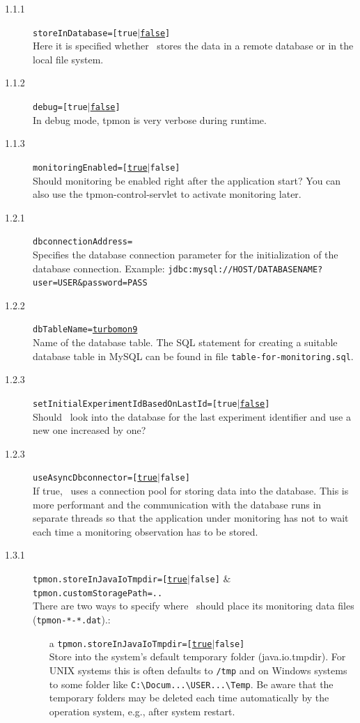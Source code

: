 \documentclass[a4paper,12pt]{scrartcl}
\begin{document}
\begin{description}
 \item [1.1.1] \texttt{storeInDatabase=[true$|$\underline{false}]} \\
Here it is specified whether \tpmon\ stores the data in a remote database or in the local file system.
\item [1.1.2] \texttt{debug=[true$|$\underline{false}]}  \\
In debug mode, tpmon is very verbose during runtime.
\item [1.1.3] \texttt{monitoringEnabled=[\underline{true}$|$false]} \\
Should monitoring be enabled right after the application start? You can also use the tpmon-control-servlet
to activate monitoring later.
\item [1.2.1] \texttt{dbconnectionAddress=} \\
Specifies the database connection parameter for the initialization of the database connection. Example:
\small
\texttt{jdbc:mysql://HOST/DATABASENAME?user=USER\&password=PASS}
\normalsize
\item [1.2.2] \texttt{dbTableName=\underline{turbomon9}} \\
Name of the database table. The SQL statement for creating a suitable database table
in MySQL can be found in file \small \texttt{table-for-monitoring.sql}\normalsize.
\item [1.2.3] \texttt{setInitialExperimentIdBasedOnLastId=[true$|$\underline{false}]} \\
Should \tpmon\ look into the database for the last experiment identifier and use a new one increased by one?
\item [1.2.3] \texttt{useAsyncDbconnector=[\underline{true}$|$false]} \\
If true, \tpmon\ uses a connection pool for storing data into the database. This is more performant and the communication
with the database runs in separate threads so that the application under monitoring has not to wait each time a monitoring
observation has to be stored.
\item [1.3.1] \footnotesize \texttt{tpmon.storeInJavaIoTmpdir=[\underline{true}$|$false]} $\&$ \texttt{tpmon.customStoragePath=..} \normalsize \\
There are two ways to specify where \tpmon\ should place its monitoring data files (\texttt{tpmon-*-*.dat}).:
\begin{enumerate}
\item [a] \texttt{tpmon.storeInJavaIoTmpdir=[\underline{true}$|$false]} \\ Store into the system's default temporary folder (java.io.tmpdir). For UNIX systems this is often defaults to \texttt{/tmp} and on Windows systems to some folder like \verb=C:\Docum...\USER...\Temp=. Be aware that the temporary folders may be deleted each time automatically by the operation system, e.g., after system restart.

\end{enumerate}
\end{description}
\end{document}
